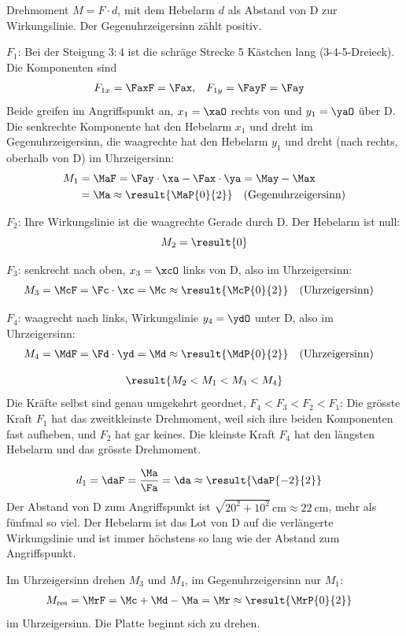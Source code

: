 Drehmoment $M = F\cdot d$, mit dem Hebelarm $d$ als Abstand von D zur Wirkungslinie. Der Gegenuhrzeigersinn zählt positiv.

\begin{abcliste}
\abc
$F_1$: Bei der Steigung $3:4$ ist die schräge Strecke 5 Kästchen lang (3-4-5-Dreieck). Die Komponenten sind
\begin{align}
 F_{1x} &= \FaxF = \Fax, & F_{1y} &= \FayF = \Fay
\end{align}
Beide greifen im Angriffspunkt an, $x_1 = \xaO$ rechts von und $y_1 = \yaO$ über D. Die senkrechte Komponente hat den Hebelarm $x_1$ und dreht im Gegenuhrzeigersinn, die waagrechte hat den Hebelarm $y_1$ und dreht (nach rechts, oberhalb von D) im Uhrzeigersinn:
\begin{align}
 M_1 &= \MaF = \Fay\cdot\xa - \Fax\cdot\ya = \May - \Max \\
   &= \Ma \approx \result{\MaP{0}{2}} \quad\text{(Gegenuhrzeigersinn)}
\end{align}

$F_2$: Ihre Wirkungslinie ist die waagrechte Gerade durch D. Der Hebelarm ist null:
\[
 M_2 = \result{0}
\]

$F_3$: senkrecht nach oben, $x_3 = \xcO$ links von D, also im Uhrzeigersinn:
\begin{align}
 M_3 &= \McF = \Fc\cdot\xc = \Mc \approx \result{\McP{0}{2}} \quad\text{(Uhrzeigersinn)}
\end{align}

$F_4$: waagrecht nach links, Wirkungslinie $y_4 = \ydO$ unter D, also im Uhrzeigersinn:
\begin{align}
 M_4 &= \MdF = \Fd\cdot\yd = \Md \approx \result{\MdP{0}{2}} \quad\text{(Uhrzeigersinn)}
\end{align}

\abc
\[
 \result{M_2 < M_1 < M_3 < M_4}
\]
Die Kräfte selbst sind genau umgekehrt geordnet, $F_4 < F_3 < F_2 < F_1$: Die grösste Kraft $F_1$ hat das zweitkleinste Drehmoment, weil sich ihre beiden Komponenten fast aufheben, und $F_2$ hat gar keines. Die kleinste Kraft $F_4$ hat den längsten Hebelarm und das grösste Drehmoment.

\abc
\begin{align}
 d_1 &= \daF = \frac{\Ma}{\Fa} = \da \approx \result{\daP{-2}{2}}
\end{align}
Der Abstand von D zum Angriffspunkt ist $\sqrt{20^2+10^2}\,\si{\cm}\approx\SI{22}{\cm}$, mehr als fünfmal so viel. Der Hebelarm ist das Lot von D auf die verlängerte Wirkungslinie und ist immer höchstens so lang wie der Abstand zum Angriffspunkt.

\abc
Im Uhrzeigersinn drehen $M_3$ und $M_4$, im Gegenuhrzeigersinn nur $M_1$:
\begin{align}
 M_\mathrm{res} &= \MrF = \Mc + \Md - \Ma = \Mr \approx \result{\MrP{0}{2}}
\end{align}
im Uhrzeigersinn. Die Platte beginnt sich  zu drehen.
\end{abcliste}

